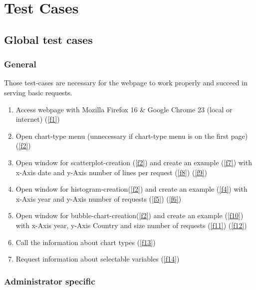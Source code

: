 \section{Test Cases}

\subsection{Global test cases}

\renewcommand{\theenumi}{/T\arabic{enumi}0/}
\renewcommand{\labelenumi}{\theenumi}

\subsubsection{General}

Those test-cases are necessary for the webpage to work properly and succeed in serving basic requests.

\begin{enumerate}

\item Access webpage with Mozilla Firefox 16 \& 
Google Chrome 23 (local or internet) (\ref{f1})

\item Open chart-type menu (unnecessary if chart-type menu is on the first page) (\ref{f2})

\item Open window for scatterplot-creation (\ref{f2}) and create an example (\ref{f7})
      with x-Axis date and y-Axis number of lines per request (\ref{f8}) (\ref{f9})

\item Open window for histogram-creation(\ref{f2}) and create an example (\ref{f4})
      with x-Axis year and y-Axis number of requests (\ref{f5}) (\ref{f6})

\item Open window for bubble-chart-creation(\ref{f2}) and create an example (\ref{f10})
      with x-Axis year, y-Axis Country and size number of requests (\ref{f11}) (\ref{f12})

\item Call the information about chart types (\ref{f13})

\item Request information about selectable variables (\ref{f14})

\end{enumerate}

\subsubsection{Administrator specific}

